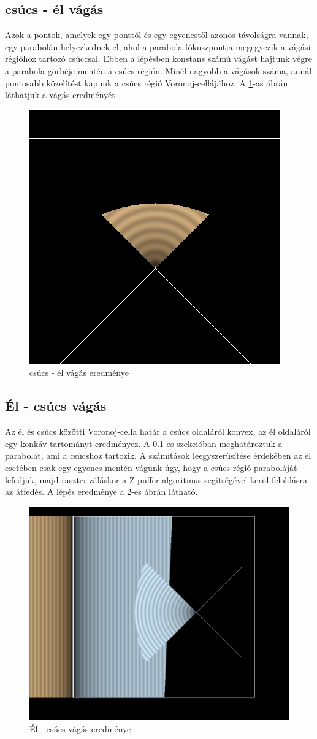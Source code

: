 \subsection{csúcs - él vágás} \label{vertex_segment_cut}
Azok a pontok, amelyek egy ponttól és egy egyenestől azonos távolságra vannak, egy parabolán helyezkednek el, ahol a parabola fókuszpontja megegyezik a vágási régióhoz tartozó csúccsal. Ebben a lépésben konstans számú vágást hajtunk végre a parabola görbéje mentén a csúcs régión. Minél nagyobb a vágások száma, annál pontosabb közelítést kapunk a csúcs régió Voronoj-cellájához. A \ref{fig:vertex_segment_cut-1}-as ábrán láthatjuk a vágás eredményét.

\begin{figure}[H]
    \centering
    \includegraphics[width=.55\linewidth]{images/vertex_segment_cut.png}
    \caption{csúcs - él vágás eredménye}
    \label{fig:vertex_segment_cut-1}
\end{figure}

\subsection{Él - csúcs vágás}
Az él és csúcs közötti Voronoj-cella határ a csúcs oldaláról konvex, az él oldaláról egy konkáv tartományt eredményez. A \ref{vertex_segment_cut}-es szekcióban meghatároztuk a parabolát, ami a csúcshoz tartozik. A számítások leegyszerűsítése érdekében az él esetében csak egy egyenes mentén vágunk úgy, hogy a csúcs régió paraboláját lefedjük, majd raszterizáláskor a Z-puffer algoritmus segítségével kerül feloldásra az átfedés. A lépés eredménye a \ref{fig:segment_vertex_cut-1}-es ábrán látható.

\begin{figure}[H]
    \centering
    \includegraphics[width=.55\linewidth]{images/segment_vertex_cut.png}
    \caption{Él - csúcs vágás eredménye}
    \label{fig:segment_vertex_cut-1}
\end{figure}

